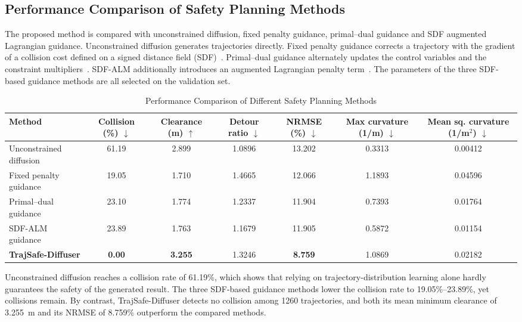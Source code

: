 \documentclass[journal]{IEEEtran}
\begin{document}
\subsection{Performance Comparison of Safety Planning Methods}
The proposed method is compared with unconstrained diffusion, fixed penalty
guidance, primal--dual guidance and SDF augmented Lagrangian guidance.
Unconstrained diffusion generates trajectories directly. Fixed penalty guidance
corrects a trajectory with the gradient of a collision cost defined on a signed
distance field (SDF)~\cite{fast}. Primal--dual guidance alternately updates the control
variables and the constraint multipliers~\cite{nocedal}. SDF-ALM additionally introduces an
augmented Lagrangian penalty term~\cite{hestenes,nocedal}. The parameters of the three SDF-based
guidance methods are all selected on the validation set.

\begin{table}[!t]
\caption{Performance Comparison of Different Safety Planning Methods}
\label{tab:methods}
\centering
\footnotesize
\setlength{\tabcolsep}{4pt}
\begin{tabular}{lcccccc}
\hline
Method & Collision (\%) $\downarrow$ & Clearance (m) $\uparrow$ &
Detour ratio $\downarrow$ & NRMSE (\%) $\downarrow$ &
Max curvature (1/m) $\downarrow$ &
Mean sq. curvature (1/m$^2$) $\downarrow$ \\
\hline
Unconstrained diffusion & 61.19 & 2.899 & 1.0896 & 13.202 & 0.3313 & 0.00412 \\
Fixed penalty guidance  & 19.05 & 1.710 & 1.4665 & 12.066 & 1.1893 & 0.04596 \\
Primal--dual guidance   & 23.10 & 1.774 & 1.2337 & 11.904 & 0.7393 & 0.01764 \\
SDF-ALM guidance        & 23.89 & 1.763 & 1.1679 & 11.905 & 0.5872 & 0.01154 \\
\textbf{TrajSafe-Diffuser} & \textbf{0.00} & \textbf{3.255} & 1.3246 &
\textbf{8.759} & 1.0869 & 0.02182 \\
\hline
\end{tabular}
\end{table}

Unconstrained diffusion reaches a collision rate of 61.19\%, which shows that
relying on trajectory-distribution learning alone hardly guarantees the safety of
the generated result. The three SDF-based guidance methods lower the collision
rate to 19.05\%--23.89\%, yet collisions remain. By contrast, TrajSafe-Diffuser
detects no collision among 1260 trajectories, and both its mean minimum
clearance of 3.255~m and its NRMSE of 8.759\% outperform the compared methods.
\end{document}
